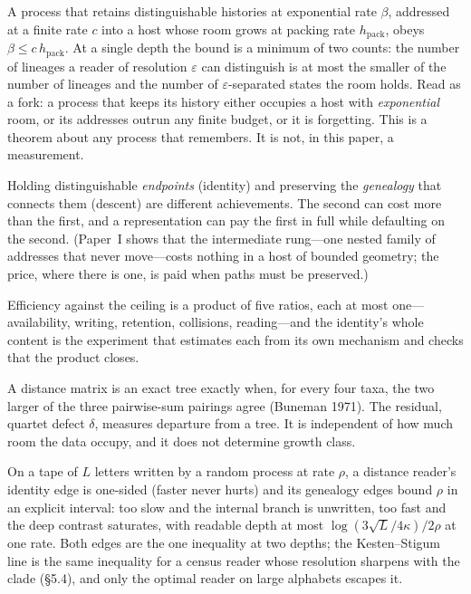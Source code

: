 \documentclass[11pt]{article}
\newcommand{\hpack}{h_{\mathrm{pack}}}
\begin{document}
\begin{description}[leftmargin=1.2em,style=nextline]
\item[The room (the limit).] A process that retains distinguishable histories at exponential rate $\beta$, addressed at a finite rate $c$ into a host whose room grows at packing rate $\hpack$, obeys $\beta \le c\,\hpack$. At a single depth the bound is a minimum of two counts: the number of lineages a reader of resolution $\varepsilon$ can distinguish is at most the smaller of the number of lineages and the number of $\varepsilon$-separated states the room holds. Read as a fork: a process that keeps its history either occupies a host with \emph{exponential} room, or its addresses outrun any finite budget, or it is forgetting. This is a theorem about any process that remembers. It is not, in this paper, a measurement.
\item[Names versus paths (the ladder).] Holding distinguishable \emph{endpoints} (identity) and preserving the \emph{genealogy} that connects them (descent) are different achievements. The second can cost more than the first, and a representation can pay the first in full while defaulting on the second. (Paper~I shows that the intermediate rung---one nested family of addresses that never move---costs nothing in a host of bounded geometry; the price, where there is one, is paid when paths must be preserved.)
\item[The audit.] Efficiency against the ceiling is a product of five ratios, each at most one---availability, writing, retention, collisions, reading---and the identity's whole content is the experiment that estimates each from its own mechanism and checks that the product closes.
\item[The classifier (quartets).] A distance matrix is an exact tree exactly when, for every four taxa, the two larger of the three pairwise-sum pairings agree (Buneman 1971). The residual, quartet defect $\delta$, measures departure from a tree. It is independent of how much room the data occupy, and it does not determine growth class.
\item[The window (finite tapes).] On a tape of $L$ letters written by a random process at rate $\rho$, a distance reader's identity edge is one-sided (faster never hurts) and its genealogy edges bound $\rho$ in an explicit interval: too slow and the internal branch is unwritten, too fast and the deep contrast saturates, with readable depth at most $\log(3\sqrt L/4\kappa)/2\rho$ at one rate. Both edges are the one inequality at two depths; the Kesten--Stigum line is the same inequality for a census reader whose resolution sharpens with the clade (\S5.4), and only the optimal reader on large alphabets escapes it.
\end{description}
\end{document}
